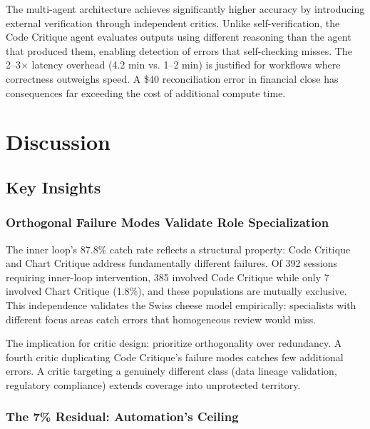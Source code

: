 \documentclass[sigconf]{acmart}
\begin{document}
The multi-agent architecture achieves significantly higher accuracy by introducing external verification through independent critics. Unlike self-verification, the Code Critique agent evaluates outputs using different reasoning than the agent that produced them, enabling detection of errors that self-checking misses. The 2--3$\times$ latency overhead (4.2 min vs. 1--2 min) is justified for workflows where correctness outweighs speed. A \$40 reconciliation error in financial close has consequences far exceeding the cost of additional compute time.

\section{Discussion}
\label{sec:discussion}

\subsection{Key Insights}

\subsubsection{Orthogonal Failure Modes Validate Role Specialization}

The inner loop's 87.8\% catch rate reflects a structural property: Code Critique and Chart Critique address fundamentally different failures. Of 392 sessions requiring inner-loop intervention, 385 involved Code Critique while only 7 involved Chart Critique (1.8\%), and these populations are mutually exclusive. This independence validates the Swiss cheese model empirically: specialists with different focus areas catch errors that homogeneous review would miss.

The implication for critic design: prioritize orthogonality over redundancy. A fourth critic duplicating Code Critique's failure modes catches few additional errors. A critic targeting a genuinely different class (data lineage validation, regulatory compliance) extends coverage into unprotected territory.

\subsubsection{The 7\% Residual: Automation's Ceiling}
\end{document}
